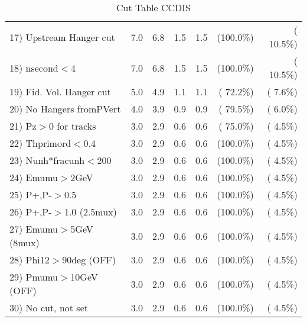 \begin{table}[h!]
\begin{tabular}{||l||r|r|r|r|r|r||}
 17) Upstream Hanger cut  &          7.0 &          6.8 &          1.5 &          1.5 & (100.0\%) & ( 10.5\%) \\
 18) nsecond$<$4          &          7.0 &          6.8 &          1.5 &          1.5 & (100.0\%) & ( 10.5\%) \\
 19) Fid. Vol. Hanger cut &          5.0 &          4.9 &          1.1 &          1.1 & ( 72.2\%) & (  7.6\%) \\
 20) No Hangers fromPVert &          4.0 &          3.9 &          0.9 &          0.9 & ( 79.5\%) & (  6.0\%) \\
 21) Pz$>$0 for tracks    &          3.0 &          2.9 &          0.6 &          0.6 & ( 75.0\%) & (  4.5\%) \\
 22) Thprimord$<$0.4      &          3.0 &          2.9 &          0.6 &          0.6 & (100.0\%) & (  4.5\%) \\
 23) Nunh*fracunh$<$200   &          3.0 &          2.9 &          0.6 &          0.6 & (100.0\%) & (  4.5\%) \\
 24) Emumu$>$2GeV         &          3.0 &          2.9 &          0.6 &          0.6 & (100.0\%) & (  4.5\%) \\
 25) P+,P-$>$0.5          &          3.0 &          2.9 &          0.6 &          0.6 & (100.0\%) & (  4.5\%) \\
 26) P+,P-$>$1.0 (2.5mux) &          3.0 &          2.9 &          0.6 &          0.6 & (100.0\%) & (  4.5\%) \\
 27) Emumu$>$5GeV  (8mux) &          3.0 &          2.9 &          0.6 &          0.6 & (100.0\%) & (  4.5\%) \\
 28) Phi12$>$90deg  (OFF) &          3.0 &          2.9 &          0.6 &          0.6 & (100.0\%) & (  4.5\%) \\
 29) Pmumu$>$10GeV  (OFF) &          3.0 &          2.9 &          0.6 &          0.6 & (100.0\%) & (  4.5\%) \\
 30) No cut, not set      &          3.0 &          2.9 &          0.6 &          0.6 & (100.0\%) & (  4.5\%) \\
 \hline
 \hline
 \end{tabular}
 \caption{Cut Table  CCDIS    }
 \label{tab-cutcohjpsi-mumu_ncdis}
 \end{table}
